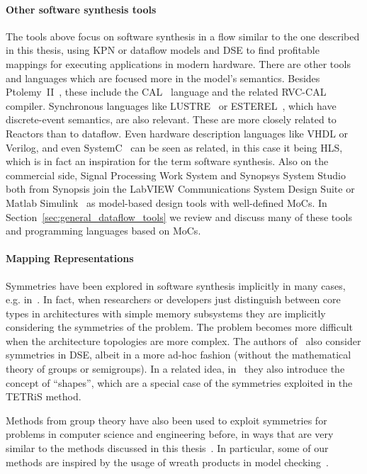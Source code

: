 \paragraph{Other software synthesis tools}
The tools above focus on software synthesis in a flow similar to the one described in this thesis, using \ac{KPN} or dataflow models and \ac{DSE} to find profitable mappings for executing applications in modern hardware.
There are other tools and languages which are focused more in the model's semantics. Besides Ptolemy~II~\cite{Ptolemaeus:14:SystemDesign}, these include the CAL~\cite{eker2003cal} language and the related \ac{RVC}-CAL compiler.
Synchronous languages like LUSTRE~\cite{lustre} or ESTEREL~\cite{esterel}, which have discrete-event semantics, are also relevant. These are more closely related to Reactors than to dataflow.
Even hardware description languages like VHDL or Verilog, and even SystemC~\cite{semantics_systemc} can be seen as related, in this case it being \ac{HLS}, which is in fact an inspiration for the term software synthesis.
Also on the commercial side, Signal Processing Work System and Synopsys System Studio both from Synopsis join the LabVIEW Communications System Design Suite or Matlab Simulink~\cite{klikpo2016modeling} as model-based design tools with well-defined \acp{MoC}.
In Section~\ref{sec:general_dataflow_tools} we review and discuss many of these tools and programming languages based on \acp{MoC}.

\paragraph{Mapping Representations}
Symmetries have been explored in software synthesis implicitly in many cases, e.g. in~\cite{singh2010communication,thompson2013exploiting}. 
In fact, when researchers or developers just distinguish between core types in architectures with simple memory subsystems they are implicitly considering the symmetries of the problem.
The problem becomes more difficult when the architecture topologies are more complex.
The authors of~\cite{schwarzer2017symmetry} also consider symmetries in \ac{DSE}, albeit in a more ad-hoc fashion (without the mathematical theory of groups or semigroups).
In a related idea, in~\cite{shapes} they also introduce the concept of ``shapes'', which are a special case of the symmetries exploited in the \ac{TETRiS} method.

Methods from group theory have also been used to exploit symmetries for problems in computer science and engineering before, in ways that are very similar to the methods discussed in this thesis~\cite{crawford1996symmetry,clarke1998symmetry}.
In particular, some of our methods are inspired by the usage of wreath products in model checking~\cite{donaldson2009constructive}.

